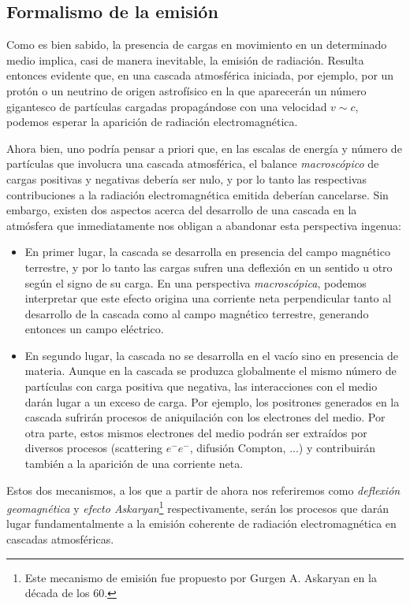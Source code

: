 \documentclass[12 pt, a4paper]{article} %
\numberwithin{equation}{section}
\numberwithin{figure}{section}
\numberwithin{table}{section}
\begin{document}
	\subsection{Formalismo de la emisión}\label{sec31}
	Como es bien sabido, la presencia de cargas en movimiento en un determinado medio implica, casi de manera inevitable, la emisión de radiación. Resulta entonces evidente que, en una cascada atmosférica iniciada, por ejemplo, por un protón o un neutrino de origen astrofísico en la que aparecerán un número gigantesco de partículas cargadas propagándose con una velocidad $v\sim c$, podemos esperar la aparición de radiación electromagnética.
	
	Ahora bien, uno podría pensar a priori que, en las escalas de energía y número de partículas que involucra una cascada atmosférica, el balance \textit{macroscópico} de cargas positivas y negativas debería ser nulo, y por lo tanto las respectivas contribuciones a la radiación electromagnética emitida deberían cancelarse. Sin embargo, existen dos aspectos acerca del desarrollo de una cascada en la atmósfera que inmediatamente nos obligan a abandonar esta perspectiva ingenua:
	\begin{itemize}
		\item En primer lugar, la cascada se desarrolla en presencia del campo magnético terrestre, y por lo tanto las cargas sufren una deflexión en un sentido u otro según el signo de su carga. En una perspectiva \textit{macroscópica}, podemos interpretar que este efecto origina una corriente neta perpendicular tanto al desarrollo de la cascada como al campo magnético terrestre, generando entonces un campo eléctrico.
		\item En segundo lugar, la cascada no se desarrolla en el vacío sino en presencia de materia. Aunque en la cascada se produzca globalmente el mismo número de partículas con carga positiva que negativa, las interacciones con el medio darán lugar a un exceso de carga. Por ejemplo, los positrones generados en la cascada sufrirán procesos de aniquilación con los electrones del medio. Por otra parte, estos mismos electrones del medio podrán ser extraídos por diversos procesos (scattering $e^-e^-$, difusión Compton, ...) y contribuirán también a la aparición de una corriente neta. 
	\end{itemize}

Estos dos mecanismos, a los que a partir de ahora nos referiremos como \textit{deflexión geomagnética} y \textit{efecto Askaryan}\footnote{ Este mecanismo de emisión fue propuesto por Gurgen A. Askaryan en la década de los 60.} respectivamente, serán los procesos que darán lugar fundamentalmente a la emisión coherente de radiación electromagnética en cascadas atmosféricas.
\end{document}

